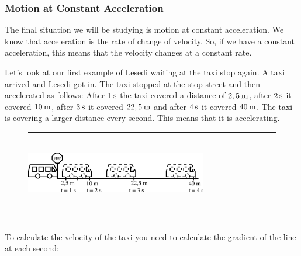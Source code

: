             \subsubsection{ Motion at Constant Acceleration}
            \nopagebreak
        \label{m38795*id71822}The final situation we will be studying is motion at constant acceleration. We know that acceleration is the rate of change of velocity. So, if we have a constant acceleration, this means that the velocity changes at a constant rate.\par 
        \label{m38795*id71827}Let's look at our first example of Lesedi waiting at the taxi stop again. A taxi arrived and Lesedi got in. The taxi stopped at the stop street and then accelerated as follows: After $1\phantom{\rule{2pt}{0ex}}\mathrm{s}$ the taxi covered a distance of $2,5\phantom{\rule{2pt}{0ex}}\mathrm{m}$, after $2\phantom{\rule{2pt}{0ex}}\mathrm{s}$ it covered $10\phantom{\rule{2pt}{0ex}}\mathrm{m}$, after $3\phantom{\rule{2pt}{0ex}}\mathrm{s}$ it covered $22,5\phantom{\rule{2pt}{0ex}}\mathrm{m}$ and after $4\phantom{\rule{2pt}{0ex}}\mathrm{s}$ it covered $40\phantom{\rule{2pt}{0ex}}\mathrm{m}$. The taxi is covering a larger distance every second. This means that it is accelerating.\par 
    \setcounter{subfigure}{0}
	\begin{figure}[H] %
    \begin{center}
    \rule[.1in]{\figurerulewidth}{.005in} \\
        \label{m38795*uid113!!!underscore!!!media}\label{m38795*uid113!!!underscore!!!printimage}\includegraphics[width=300px]{col11305.imgs/m38795_PG10C2_025.png} %
      \vspace{2pt}
    \vspace{.1in}
    \rule[.1in]{\figurerulewidth}{.005in} \\
    \end{center}
 \end{figure}       
        \label{m38795*id71842}To calculate the velocity of the taxi you need to calculate the gradient of the line at each second:\par 
        \label{m38795*id71847}
          \label{m38795*id71853}\nopagebreak\noindent{}
            

